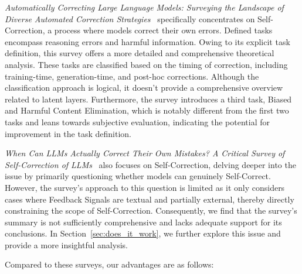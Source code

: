 \documentclass[lettersize,journal]{IEEEtran}
\begin{document}
\textit{Automatically Correcting Large Language Models: Surveying the Landscape of Diverse Automated Correction Strategies}~\cite{SurveySelfCorrection_24_TACL_UCSB} specifically concentrates on Self-Correction, a process where models correct their own errors. Defined tasks encompass reasoning errors and harmful information. Owing to its explicit task definition, this survey offers a more detailed and comprehensive theoretical analysis. These tasks are classified based on the timing of correction, including training-time, generation-time, and post-hoc corrections. Although the classification approach is logical, it doesn't provide a comprehensive overview related to latent layers. Furthermore, the survey introduces a third task, Biased and Harmful Content Elimination, which is notably different from the first two tasks and leans towards subjective evaluation, indicating the potential for improvement in the task definition.

\textit{When Can LLMs Actually Correct Their Own Mistakes? A Critical Survey of Self-Correction of LLMs}~\cite{SurveySelfCorrection_24_arXiv_PSU} also focuses on Self-Correction, delving deeper into the issue by primarily questioning whether models can genuinely Self-Correct. However, the survey's approach to this question is limited as it only considers cases where Feedback Signals are textual and partially external, thereby directly constraining the scope of Self-Correction. Consequently, we find that the survey's summary is not sufficiently comprehensive and lacks adequate support for its conclusions. In Section~\ref{sec:does_it_work}, we further explore this issue and provide a more insightful analysis.

Compared to these surveys, our advantages are as follows:
\end{document}
